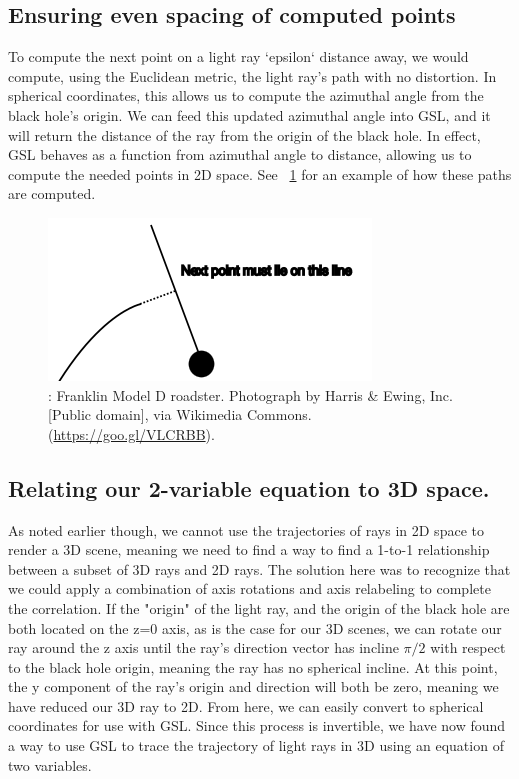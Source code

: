 \subsection {Ensuring even spacing of computed points}
To compute the next point on a light ray `epsilon` distance away, we would compute, using the Euclidean metric, the light ray's path with no distortion. In spherical coordinates, this allows us to compute the azimuthal angle from the black hole's origin. We can feed this updated azimuthal angle into GSL, and it will return the distance of the ray from the origin of the black hole. In effect, GSL behaves as a function from azimuthal angle to distance, allowing us to compute the needed points in 2D space. See ~\ref{fig:one} for an example of how these paths are computed.   
\begin{figure}[h]
  \centering
  \includegraphics[width=\linewidth]{nextpoint}
  \caption{: Franklin Model D roadster. Photograph by Harris \&
    Ewing, Inc. [Public domain], via Wikimedia
    Commons. (\url{https://goo.gl/VLCRBB}).}
    \label{fig:one}
\end{figure}

\subsection {Relating our 2-variable equation to 3D space.}
As noted earlier though, we cannot use the trajectories of rays in 2D space to render a 3D scene, meaning we need to find a way to find a 1-to-1 relationship between a subset of 3D rays and 2D rays. The solution here was to recognize that we could apply a combination of axis rotations and axis relabeling to complete the correlation. If the "origin" of the light ray, and the origin of the black hole are both located on the z=0 axis, as is the case for our 3D scenes, we can rotate our ray around the z axis until the ray's direction vector has incline $ \pi / 2 $ with respect to the black hole origin, meaning the ray has no spherical incline. At this point, the y component of the ray's origin and direction will both be zero, meaning we have reduced our 3D ray to 2D. From here, we can easily convert to spherical coordinates for use with GSL. Since this process is invertible, we have now found a way to use GSL to trace the trajectory of light rays in 3D using an equation of two variables.

